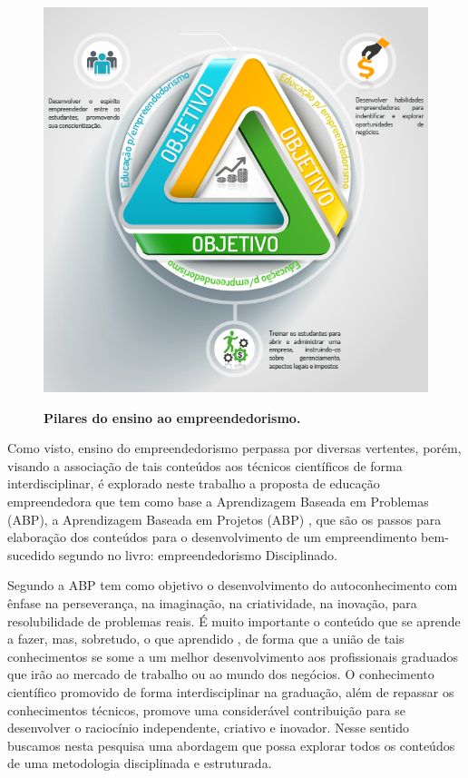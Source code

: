 \begin{figure}[H]
\centering
\caption{\textbf{Pilares do ensino ao empreendedorismo.}}
\includegraphics[scale=0.5]{Imagens/objetivos_educacao_empreendedora.png}
\label{figura_3}
\end{figure}

Como visto, ensino do empreendedorismo perpassa por diversas vertentes, porém, visando a associação de tais conteúdos aos técnicos científicos de forma interdisciplinar, é explorado neste trabalho a proposta de educação empreendedora que tem como base a Aprendizagem Baseada em Problemas (ABP), a Aprendizagem Baseada em Projetos (ABP) \cite{bender_aprendizagem_2015}, que são os passos para elaboração dos conteúdos para o desenvolvimento de um empreendimento bem-sucedido segundo \cite{aulet_empreendedorismo_2019} no livro: empreendedorismo Disciplinado. 

Segundo  a ABP tem como objetivo o desenvolvimento do autoconhecimento com ênfase na perseverança, na imaginação, na criatividade, na inovação, para resolubilidade de problemas reais. É muito importante o conteúdo que se aprende a fazer, mas, sobretudo, o que aprendido \cite{souza_disseminacao_2001}, de forma que a união de tais conhecimentos se some a um melhor desenvolvimento aos profissionais graduados que irão ao mercado de trabalho ou ao mundo dos negócios. O conhecimento científico promovido de forma interdisciplinar na graduação, além de repassar os conhecimentos técnicos, promove uma considerável contribuição para se desenvolver o raciocínio independente, criativo e inovador. Nesse sentido buscamos nesta pesquisa uma abordagem que possa explorar todos os conteúdos de uma metodologia disciplinada e estruturada.

